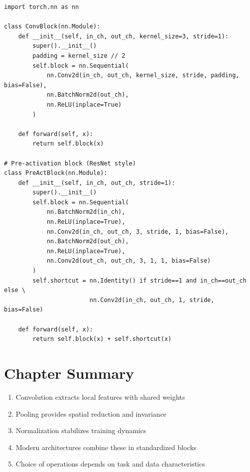 \begin{code}
    \label{code:conv_block}
\begin{verbatim}
import torch.nn as nn

class ConvBlock(nn.Module):
    def __init__(self, in_ch, out_ch, kernel_size=3, stride=1):
        super().__init__()
        padding = kernel_size // 2
        self.block = nn.Sequential(
            nn.Conv2d(in_ch, out_ch, kernel_size, stride, padding, bias=False),
            nn.BatchNorm2d(out_ch),
            nn.ReLU(inplace=True)
        )
    
    def forward(self, x):
        return self.block(x)

# Pre-activation block (ResNet style)
class PreActBlock(nn.Module):
    def __init__(self, in_ch, out_ch, stride=1):
        super().__init__()
        self.block = nn.Sequential(
            nn.BatchNorm2d(in_ch),
            nn.ReLU(inplace=True),
            nn.Conv2d(in_ch, out_ch, 3, stride, 1, bias=False),
            nn.BatchNorm2d(out_ch),
            nn.ReLU(inplace=True),
            nn.Conv2d(out_ch, out_ch, 3, 1, 1, bias=False)
        )
        self.shortcut = nn.Identity() if stride==1 and in_ch==out_ch else \
                        nn.Conv2d(in_ch, out_ch, 1, stride, bias=False)
    
    def forward(self, x):
        return self.block(x) + self.shortcut(x)
\end{verbatim}
\end{code}

\section{Chapter Summary}

\begin{enumerate}
    \item Convolution extracts local features with shared weights
    \item Pooling provides spatial reduction and invariance
    \item Normalization stabilizes training dynamics
    \item Modern architectures combine these in standardized blocks
    \item Choice of operations depends on task and data characteristics
\end{enumerate}
